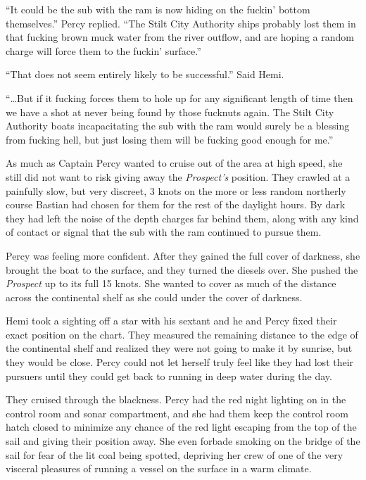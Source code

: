 \documentclass[
]{scrbook}
\begin{document}
``It could be the sub with the ram is now hiding on the fuckin' bottom
themselves.'' Percy replied. ``The Stilt City Authority ships probably
lost them in that fucking brown muck water from the river outflow, and
are hoping a random charge will force them to the fuckin' surface.''

``That does not seem entirely likely to be successful.'' Said Hemi.

``\ldots But if it fucking forces them to hole up for any significant
length of time then we have a shot at never being found by those
fucknuts again. The Stilt City Authority boats incapacitating the sub
with the ram would surely be a blessing from fucking hell, but just
losing them will be fucking good enough for me.''

As much as Captain Percy wanted to cruise out of the area at high speed,
she still did not want to risk giving away the \emph{Prospect's}
position. They crawled at a painfully slow, but very discreet, 3 knots
on the more or less random northerly course Bastian had chosen for them
for the rest of the daylight hours. By dark they had left the noise of
the depth charges far behind them, along with any kind of contact or
signal that the sub with the ram continued to pursue them.

Percy was feeling more confident. After they gained the full cover of
darkness, she brought the boat to the surface, and they turned the
diesels over. She pushed the \emph{Prospect} up to its full 15 knots.
She wanted to cover as much of the distance across the continental shelf
as she could under the cover of darkness.

Hemi took a sighting off a star with his sextant and he and Percy fixed
their exact position on the chart. They measured the remaining distance
to the edge of the continental shelf and realized they were not going to
make it by sunrise, but they would be close. Percy could not let herself
truly feel like they had lost their pursuers until they could get back
to running in deep water during the day.

They cruised through the blackness. Percy had the red night lighting on
in the control room and sonar compartment, and she had them keep the
control room hatch closed to minimize any chance of the red light
escaping from the top of the sail and giving their position away. She
even forbade smoking on the bridge of the sail for fear of the lit coal
being spotted, depriving her crew of one of the very visceral pleasures
of running a vessel on the surface in a warm climate.
\end{document}
